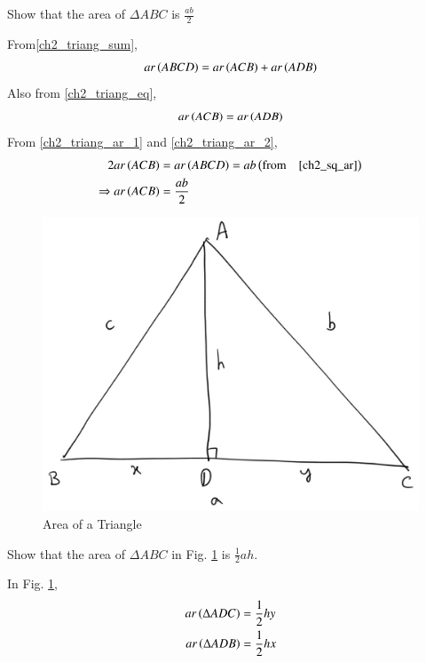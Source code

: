 \begin{problem}
	Show that the area of $\Delta ABC$ is $\frac{ab}{2}$
\end{problem}
\proof From\eqref{ch2_triang_sum},
\begin{equation}
\label{ch2_triang_ar_1}
ar\left(ABCD\right) = ar\left(ACB\right) + ar\left(ADB\right)
\end{equation}
Also from \eqref{ch2_triang_eq},
\begin{equation}
\label{ch2_triang_ar_2}
ar\left(ACB\right) = ar\left(ADB\right)
\end{equation}
From \eqref{ch2_triang_ar_1} and \eqref{ch2_triang_ar_2},
\begin{align}
2ar\left(ACB\right) &= ar\left(ABCD\right) = ab \left(\text{from} \quad \eqref{ch2_sq_ar}\right)
\\
\Rightarrow ar\left(ACB\right) &= \frac{ab}{2}
\end{align}
\begin{figure}[!h]
	\begin{center}
		
		\includegraphics[width=\columnwidth]{./figs/ch2_triang_ar}
		\vspace*{-10cm}
	\end{center}
	\caption{Area of a Triangle}
	\label{ch2_triang_ar}	
\end{figure}
\begin{problem}
	Show that the area of $\Delta ABC$ in Fig. 	\ref{ch2_triang_ar}	is $\frac{1}{2}ah$.
\end{problem}
\proof In Fig. \ref{ch2_triang_ar},
\begin{align}
ar\left(\Delta ADC\right) &= \frac{1}{2}hy \\
ar\left(\Delta ADB\right) &= \frac{1}{2}hx 
\end{align}
